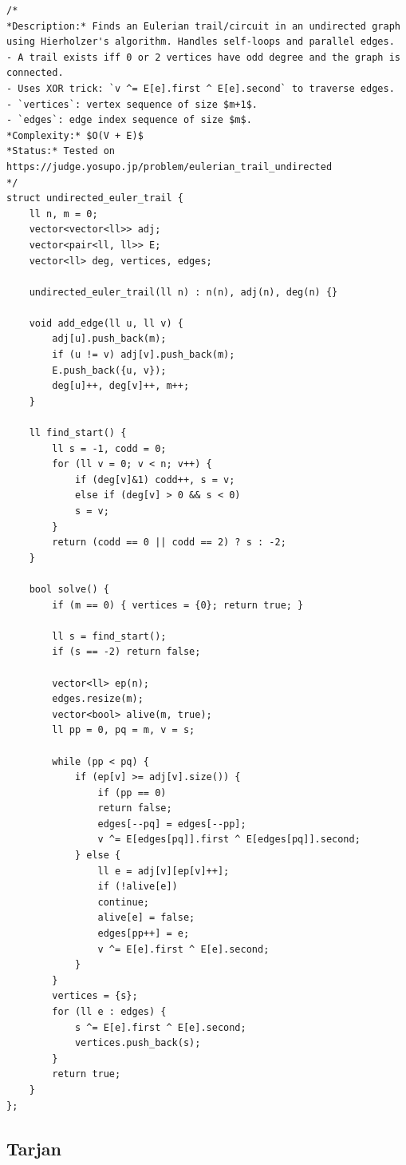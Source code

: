 \documentclass[10pt,a4paper,twocolumn]{article}
\begin{document}
\begin{lstlisting}[style=cpp, title={CaminoNoDirigidoEuler.cpp}]
/*
*Description:* Finds an Eulerian trail/circuit in an undirected graph using Hierholzer's algorithm. Handles self-loops and parallel edges.
- A trail exists iff 0 or 2 vertices have odd degree and the graph is connected.
- Uses XOR trick: `v ^= E[e].first ^ E[e].second` to traverse edges.
- `vertices`: vertex sequence of size $m+1$.
- `edges`: edge index sequence of size $m$.
*Complexity:* $O(V + E)$
*Status:* Tested on https://judge.yosupo.jp/problem/eulerian_trail_undirected
*/
struct undirected_euler_trail {
	ll n, m = 0;
	vector<vector<ll>> adj;
	vector<pair<ll, ll>> E;
	vector<ll> deg, vertices, edges;
	
	undirected_euler_trail(ll n) : n(n), adj(n), deg(n) {}
	
	void add_edge(ll u, ll v) {
		adj[u].push_back(m);
		if (u != v) adj[v].push_back(m);
		E.push_back({u, v});
		deg[u]++, deg[v]++, m++;
	}
	
	ll find_start() {
		ll s = -1, codd = 0;
		for (ll v = 0; v < n; v++) {
			if (deg[v]&1) codd++, s = v;
			else if (deg[v] > 0 && s < 0)
			s = v;
		}
		return (codd == 0 || codd == 2) ? s : -2;
	}
	
	bool solve() {
		if (m == 0) { vertices = {0}; return true; }
		
		ll s = find_start();
		if (s == -2) return false;
		
		vector<ll> ep(n);
		edges.resize(m);
		vector<bool> alive(m, true);
		ll pp = 0, pq = m, v = s;
		
		while (pp < pq) {
			if (ep[v] >= adj[v].size()) {
				if (pp == 0)
				return false;
				edges[--pq] = edges[--pp];
				v ^= E[edges[pq]].first ^ E[edges[pq]].second;
			} else {
				ll e = adj[v][ep[v]++];
				if (!alive[e])
				continue;
				alive[e] = false;
				edges[pp++] = e;
				v ^= E[e].first ^ E[e].second;
			}
		}
		vertices = {s};
		for (ll e : edges) {
			s ^= E[e].first ^ E[e].second;
			vertices.push_back(s);
		}
		return true;
	}
};
\end{lstlisting}

\subsection{Tarjan}
\end{document}
